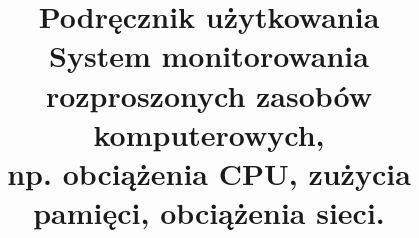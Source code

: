 \documentclass{article}
\begin{document}
\title{Podręcznik użytkowania\\
\large{System monitorowania rozproszonych zasobów komputerowych,\\
  np. obciążenia CPU, zużycia pamięci, obciążenia sieci.}}

\maketitle
\newpage
\tableofcontents
\newpage
\newcommand{\makered}[1]{\textcolor{red}{#1}}
\newcommand{\makeblue}[1]{\textcolor{blue}{#1}}
\end{document}
